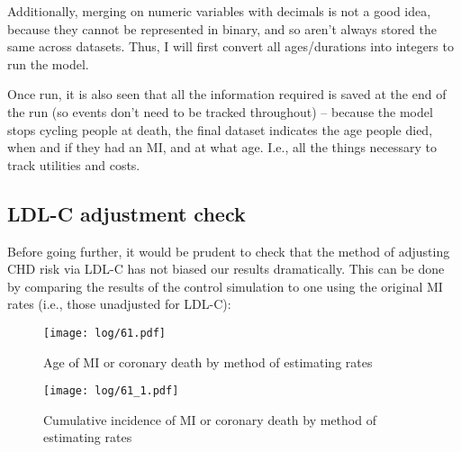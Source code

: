 \documentclass[11pt]{article}
\begin{document}
Additionally, merging on numeric variables with decimals is not a good idea, because
they cannot be represented in binary, and so aren't always stored the same across datasets. 
Thus, I will first convert all ages/durations into integers to run the model.

\color{Blue4}
\begin{stlog}\end{stlog}
\begin{stlog}\end{stlog}
\begin{stlog}\end{stlog}
\color{black}

Once run, it is also seen that all the information required
is saved at the end of the run (so events don't need to be tracked throughout)
-- because the model stops cycling people at death, the final dataset indicates 
the age people died, when and if they had an MI, and at what age. 
I.e., all the things necessary to track utilities and costs. 

\subsection{LDL-C adjustment check}

Before going further, it would be prudent to check that the method of adjusting 
CHD risk via LDL-C has not biased our results dramatically. This can be done
by comparing the results of the control simulation to one using the original
MI rates (i.e., those unadjusted for LDL-C):

\color{Blue4}
\begin{stlog}\end{stlog}
\begin{stlog}\end{stlog}
\begin{figure}
    \centering
    \texttt{[image: log/61.pdf]}
    \caption{Age of MI or coronary death by method of estimating rates}
    \label{ageMIcheck}
\end{figure}
\begin{figure}
    \centering
    \texttt{[image: log/61\_1.pdf]}
    \caption{Cumulative incidence of MI or coronary death by method of estimating rates}
    \label{cumMIcheck}
\end{figure}
\begin{stlog}\end{stlog}
\color{black}
\end{document}

